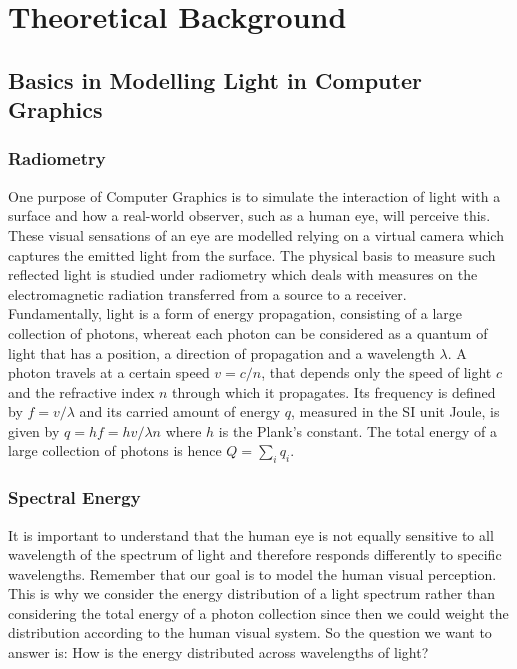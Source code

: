 \chapter{Theoretical Background}
\section{Basics in Modelling Light in Computer Graphics}
\subsection{Radiometry}
One purpose of Computer Graphics is to simulate the interaction of light with a surface and how a real-world observer, such as a human eye, will perceive this. These visual sensations of an eye are modelled relying on a virtual camera which captures the emitted light from the surface. The physical basis to measure such reflected light is studied under radiometry which deals with measures on the electromagnetic radiation transferred from a source to a receiver. \\

Fundamentally, light is a form of energy propagation, consisting of a large collection of photons, whereat each photon can be considered as a quantum of light that has a position, a direction of propagation and a wavelength $\lambda$. A photon travels at a certain speed $v = c/n$, that depends only the speed of light $c$ and the refractive index $n$ through which it propagates. Its frequency is defined by $f = v/\lambda$ and its carried amount of energy $q$, measured in the SI unit Joule, is given by $q = hf= hv/\lambda n$ where $h$ is the Plank's constant. The total energy of a large collection of photons is hence $Q = \sum_i q_i$.

\subsection{Spectral Energy}

It is important to understand that the human eye is not equally sensitive to all wavelength of the spectrum of light and therefore responds differently to specific wavelengths. Remember that our goal is to model the human visual perception. This is why we consider the energy distribution of a light spectrum rather than considering the total energy of a photon collection since then we could weight the distribution according to the human visual system. So the question we want to answer is: How is the energy distributed across wavelengths of light? \\

